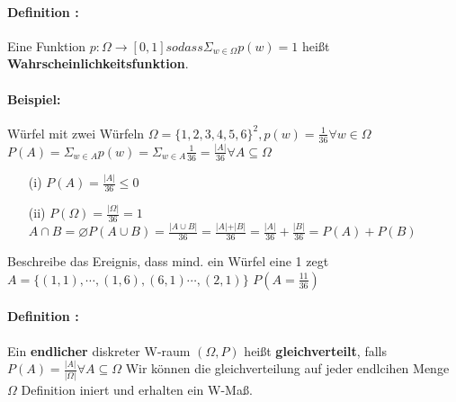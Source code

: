 \documentclass{article}
\begin{document}
\paragraph*{Definition : } Eine Funktion \(p : \Omega \to [0, 1] sodass \Sigma_{w \in \Omega} p(w) = 1\) heißt \textbf{Wahrscheinlichkeitsfunktion}.
\paragraph*{Beispiel:} Würfel mit zwei Würfeln \(\Omega = \{1, 2, 3, 4, 5, 6\}^2, p(w) = \frac{1}{36} \forall w \in \Omega\) \\ \(P(A) = \Sigma_{w \in A} p(w) = \Sigma_{w \in A} \frac{1}{36} = \frac{\vert A \vert}{36} \forall A \subseteq \Omega\)
\begin{itemize}
    \item [(i)] \(P(A) = \frac{\vert A \vert}{36} \leq 0\)
    \item [(ii)] \(P(\Omega) = \frac{\vert \Omega \vert}{36} = 1\) \\ \(A \cap B  = \varnothing P(A \cup B) = \frac{\vert A \cup B \vert}{36} = \frac{\vert A \vert + \vert B \vert}{36} = \frac{\vert A \vert }{36} + \frac{\vert B \vert }{36} = P(A) + P(B)\)
\end{itemize}

Beschreibe das Ereignis, dass mind. ein Würfel eine 1 zegt \(A = \{(1,1), \cdots, (1,6), (6,1) \cdots, (2,1)\}\) \(P(A = \frac{11}{36})\)

\paragraph*{Definition : } Ein \textbf{endlicher} diskreter W-raum \((\Omega, P)\) heißt \textbf{gleichverteilt}, falls \(P(A) = \frac{\vert A \vert}{\vert \Omega \vert} \forall A \subseteq \Omega\) Wir können die gleichverteilung auf jeder endlcihen Menge \(\Omega\) Definition iniert und erhalten ein W-Maß.
\end{document}
